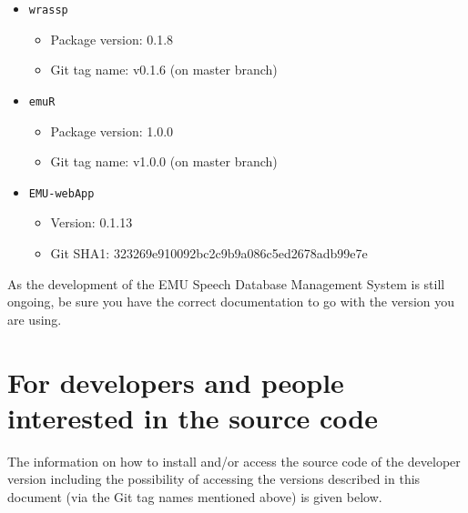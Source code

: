 \documentclass[]{book}
\providecommand{\tightlist}{%
  \setlength{\itemsep}{0pt}\setlength{\parskip}{0pt}}
\theoremstyle{definition}
\theoremstyle{definition}
\theoremstyle{definition}
\theoremstyle{remark}
\begin{document}
\begin{itemize}
\tightlist
\item
  \texttt{wrassp}

  \begin{itemize}
  \tightlist
  \item
    Package version: 0.1.8
  \item
    Git tag name: v0.1.6 (on master branch)
  \end{itemize}
\item
  \texttt{emuR}

  \begin{itemize}
  \tightlist
  \item
    Package version: 1.0.0
  \item
    Git tag name: v1.0.0 (on master branch)
  \end{itemize}
\item
  \texttt{EMU-webApp}

  \begin{itemize}
  \tightlist
  \item
    Version: 0.1.13
  \item
    Git SHA1: 323269e910092bc2c9b9a086c5ed2678adb99e7e
  \end{itemize}
\end{itemize}

As the development of the EMU Speech Database Management System is still
ongoing, be sure you have the correct documentation to go with the
version you are using.

\hypertarget{for-developers-and-people-interested-in-the-source-code}{%
\section{For developers and people interested in the source
code}\label{for-developers-and-people-interested-in-the-source-code}}

The information on how to install and/or access the source code of the
developer version including the possibility of accessing the versions
described in this document (via the Git tag names mentioned above) is
given below.
\end{document}
